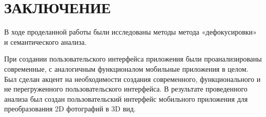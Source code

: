 \documentclass[a4paper,12pt]{article}
\begin{document}
%
\pagebreak
%

\pagebreak
\section*{\centering ЗАКЛЮЧЕНИЕ}
В ходе проделанной работы были исследованы методы  метода «дефокусировки» и семантического анализа.

При создании пользовательского интерфейса приложения были проанализированы современные, с аналогичным функционалом мобильные приложения в целом. Был сделан акцент на необходимости создания современного, функционального и не перегруженного пользовательского интерфейса. В результате проведенного анализа был создан пользовательский интерфейс мобильного приложения для преобразования 2D фотографий в 3D вид.


\pagebreak
{}
\printbibliography


\end{document}
